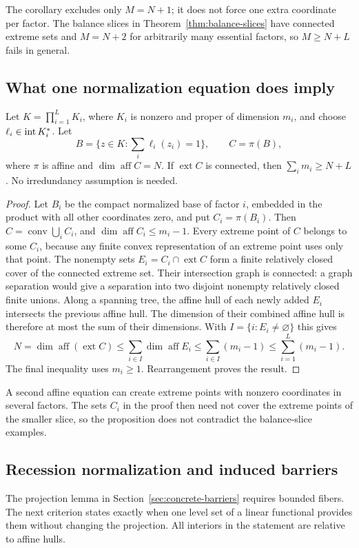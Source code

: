 The corollary excludes only $M=N+1$; it does not force one extra
coordinate per factor. The balance slices in
Theorem~\ref{thm:balance-slices} have connected extreme sets and $M=N+2$
for arbitrarily many essential factors, so $M\geq N+L$ fails in general.

\subsection{What one normalization equation does imply}
\begin{proposition}
\label{prop:normalized-base-tax}
Let $K=\prod_{i=1}^L K_i$, where $K_i$ is nonzero and proper of
dimension $m_i$, and choose $\ell_i\in\operatorname{int} K_i^*$. Let
\[
 B=\{z\in K:\sum_i\ell_i(z_i)=1\},\qquad C=\pi(B),
\]
where $\pi$ is affine and $\dim\operatorname{aff}C=N$.
If $\operatorname{ext}C$ is connected, then
$\sum_i m_i\geq N+L$. No irredundancy assumption is needed.
\end{proposition}
\begin{proof}
Let $B_i$ be the compact normalized base of factor $i$, embedded in
the product with all other coordinates zero, and put $C_i=\pi(B_i)$.
Then $C=\operatorname{conv}\bigcup_i C_i$, and
$\dim\operatorname{aff}C_i\leq m_i-1$. Every extreme point of $C$
belongs to some $C_i$, because any finite convex representation of an
extreme point uses only that point. The nonempty sets
$E_i=C_i\cap\operatorname{ext}C$ form a finite relatively closed cover
of the connected extreme set. Their intersection graph is connected:
a graph separation would give a separation into two disjoint nonempty
relatively closed finite unions. Along a spanning tree, the affine
hull of each newly added $E_i$ intersects the previous affine hull.
The dimension of their combined affine hull is therefore at most
the sum of their dimensions. With $I=\{i:E_i\ne\varnothing\}$ this gives
\[
 N=\dim\operatorname{aff}(\operatorname{ext}C)
 \leq\sum_{i\in I}\dim\operatorname{aff}E_i
 \leq\sum_{i\in I}(m_i-1)
 \leq\sum_{i=1}^L(m_i-1).
\]
The final inequality uses $m_i\geq1$. Rearrangement proves the result.
\end{proof}

A second affine equation can create extreme points with nonzero
coordinates in several factors. The sets $C_i$ in the proof then need not
cover the extreme points of the smaller slice, so the proposition does
not contradict the balance-slice examples.

\subsection{Recession normalization and induced barriers}
The projection lemma in Section~\ref{sec:concrete-barriers} requires
bounded fibers. The next criterion states exactly when one level set of
a linear functional provides them without changing the projection.
All interiors in the statement are
relative to affine hulls.

